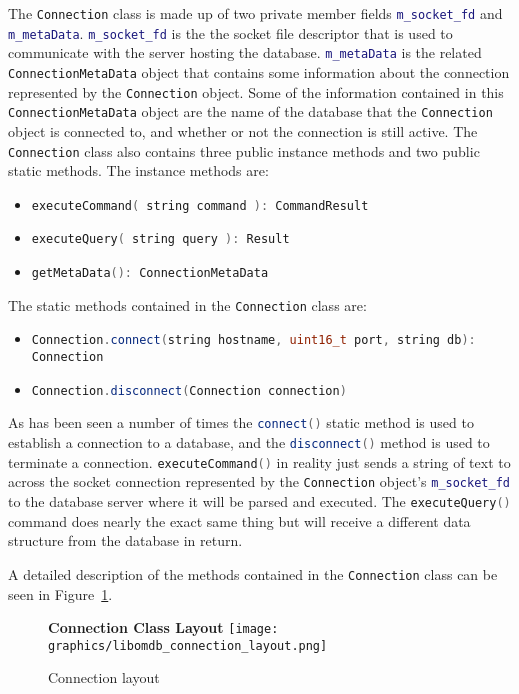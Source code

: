 \documentclass[letterpaper, 12pt]{article}
\newcommand{\inlinecode}[1]{\colorbox{codegrey}{\lstinline[language=C++]{#1}}}
\begin{document}
  \par\vspace{\baselineskip}
  The \inlinecode{Connection} class is made up of two private
  member fields \inlinecode{m_socket_fd} and
  \inlinecode{m_metaData}.
  \inlinecode{m_socket_fd} is the the socket file descriptor that is
  used to communicate with the server hosting the database.
  \inlinecode{m_metaData} is the related
  \inlinecode{ConnectionMetaData} object that contains some
  information about the connection represented by the
  \inlinecode{Connection} object. Some of the information contained
  in this \inlinecode{ConnectionMetaData} object are
  the name of the database that the \inlinecode{Connection} object
  is connected to, and whether or not the connection is still active. The
  \inlinecode{Connection} class also contains three public
  instance methods and two public static methods. The instance methods are:
  \begin{itemize}
    \item \inlinecode{executeCommand( string command ): CommandResult}
    \item \inlinecode{executeQuery( string query ): Result}
    \item \inlinecode{getMetaData(): ConnectionMetaData}
  \end{itemize}
  The static methods contained in the \inlinecode{Connection} class
  are:
  \begin{itemize}
  	\item \inlinecode{Connection.connect(string hostname, uint16_t port, string db): Connection}
  	\item \inlinecode{Connection.disconnect(Connection connection)}
  \end{itemize}
  As has been seen a number of times the \inlinecode{connect()}
  static method is used  to establish a connection to a database, and the
  \inlinecode{disconnect()} method is used to terminate a connection.
  \inlinecode{executeCommand()} in reality just sends a string of
  text to across the socket connection represented by the
  \inlinecode{Connection} object's
  \inlinecode{m_socket_fd} to the database server where it will be
  parsed and executed. The \inlinecode{executeQuery()} command
  does nearly the exact same thing but will receive a different data structure from the
  database in return.
  \par\vspace{\baselineskip}
  A detailed description of the methods contained in the \inlinecode{Connection} class 
  can be seen in Figure~\ref{fig:connection_methods}.
  \begin{figure}
    \centering
    \label{fig:connection_methods}
    \textbf{Connection Class Layout}
    \texttt{[image: graphics/libomdb\_connection\_layout.png]}
	\caption{Connection layout}
  \end{figure}
  \par\vspace{\baselineskip}
\end{document}
